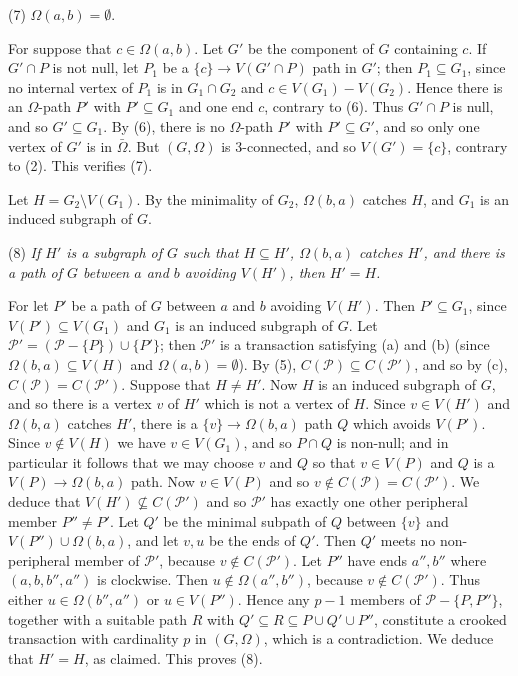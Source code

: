 \hspace*{12pt}(7) $\Omega(a, b) = \emptyset$.

For suppose that $c \in \Omega(a, b)$. Let $G'$ be the component of $G$ containing $c$. If $G' \cap P$ is not null, let $P_1$ be a $\{c\} \to V(G' \cap P)$ path in $G'$; then $P_1 \subseteq G_1$, since no internal vertex of $P_1$ is in $G_1 \cap G_2$ and $c \in V(G_1) - V(G_2)$. Hence there is an $\Omega$-path $P'$ with $P' \subseteq G_1$ and one end $c$, contrary to (6). Thus $G' \cap P$ is null, and so $G' \subseteq G_1$. By (6), there is no $\Omega$-path $P'$ with $P' \subseteq G'$, and so only one vertex of $G'$ is in $\bar{\Omega}$. But $(G, \Omega)$ is 3-connected, and so $V(G') = \{c\}$, contrary to (2). This verifies (7).

Let $H = G_2 \setminus V(G_1)$. By the minimality of $G_2$, $\Omega(b, a)$ catches $H$, and $G_1$ is an induced subgraph of $G$.

\hspace*{12pt}(8) \textit{If $H'$ is a subgraph of $G$ such that $H \subseteq H'$, $\Omega(b, a)$ catches $H'$, and there is a path of $G$ between $a$ and $b$ avoiding $V(H')$, then $H' = H$.}

For let $P'$ be a path of $G$ between $a$ and $b$ avoiding $V(H')$. Then $P' \subseteq G_1$, since $V(P') \subseteq V(G_1)$ and $G_1$ is an induced subgraph of $G$. Let $\mathcal{P}' = (\mathcal{P} - \{P\}) \cup \{P'\}$; then $\mathcal{P}'$ is a transaction satisfying (a) and (b) (since $\Omega(b, a) \subseteq V(H)$ and $\Omega(a, b) = \emptyset$). By (5), $C(\mathcal{P}) \subseteq C(\mathcal{P}')$, and so by (c), $C(\mathcal{P}) = C(\mathcal{P}')$. Suppose that $H \ne H'$. Now $H$ is an induced subgraph of $G$, and so there is a vertex $v$ of $H'$ which is not a vertex of $H$. Since $v \in V(H')$ and $\Omega(b, a)$ catches $H'$, there is a $\{v\} \to \Omega(b, a)$ path $Q$ which avoids $V(P')$. Since $v \notin V(H)$ we have $v \in V(G_1)$, and so $P \cap Q$ is non-null; and in particular it follows that we may choose $v$ and $Q$ so that $v \in V(P)$ and $Q$ is a $V(P) \to \Omega(b, a)$ path. Now $v \in V(P)$ and so $v \notin C(\mathcal{P}) = C(\mathcal{P}')$. We deduce that $V(H') \not\subseteq C(\mathcal{P}')$ and so $\mathcal{P}'$ has exactly one other peripheral member $P'' \ne P'$. Let $Q'$ be the minimal subpath of $Q$ between $\{v\}$ and $V(P'') \cup \Omega(b, a)$, and let $v, u$ be the ends of $Q'$. Then $Q'$ meets no non-peripheral member of $\mathcal{P}'$, because $v \notin C(\mathcal{P}')$. Let $P''$ have ends $a'', b''$ where $(a, b, b'', a'')$ is clockwise. Then $u \notin \Omega(a'', b'')$, because $v \notin C(\mathcal{P}')$. Thus either $u \in \Omega(b'', a'')$ or $u \in V(P'')$. Hence any $p - 1$ members of $\mathcal{P} - \{P, P''\}$, together with a suitable path $R$ with $Q' \subseteq R \subseteq P \cup Q' \cup P''$, constitute a crooked transaction with cardinality $p$ in $(G, \Omega)$, which is a contradiction. We deduce that $H' = H$, as claimed. This proves (8).

